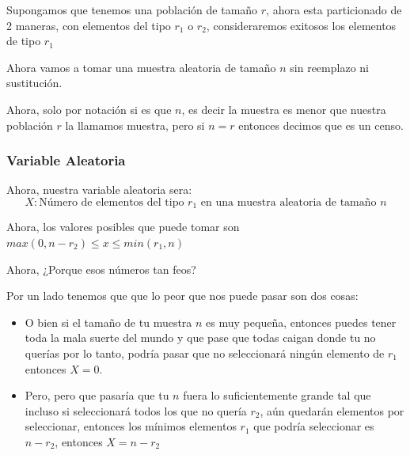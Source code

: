 \documentclass[12pt, fleqn]{report}                             %
\theoremstyle{break}                                            %
\begin{document}
                Supongamos que tenemos una población de tamaño $r$, ahora
                esta particionado de 2 maneras, con elementos del tipo $r_1$
                o $r_2$, consideraremos exitosos los elementos de tipo $r_1$

                Ahora vamos a tomar una muestra aleatoria de tamaño $n$ sin reemplazo
                ni sustitución.

                Ahora, solo por notación si es que $n$, es decir la muestra es menor
                que nuestra población $r$ la llamamos muestra, pero si $n = r$ entonces
                decimos que es un censo.

                \vspace{1em}
                \subsubsection{Variable Aleatoria}

                    Ahora, nuestra variable aleatoria sera:
                    \begin{equation*}
                        X : \text{Número de elementos del tipo $r_1$ en una muestra aleatoria de tamaño $n$}
                    \end{equation*}

                    Ahora, los valores posibles que puede tomar son $max(0, n - r_2) \leq x \leq min(r_1, n)$

                    Ahora, ¿Porque esos números tan feos?

                    Por un lado tenemos que que lo peor que nos puede pasar son dos cosas:
                    \begin{itemize}
                        \item 
                            O bien si el tamaño de tu muestra $n$ es muy pequeña, entonces puedes
                            tener toda la mala suerte del mundo y que pase que todas caigan donde
                            tu no querías por lo tanto, podría pasar que no seleccionará
                            ningún elemento de $r_1$ entonces $X = 0$.

                        \item
                            Pero, pero que pasaría que tu $n$ fuera lo suficientemente grande tal que
                            incluso si seleccionará todos los que no quería $r_2$, aún quedarán elementos
                            por seleccionar, entonces los mínimos elementos $r_1$ que podría seleccionar 
                            es $n - r_2$, entonces $X = n - r_2$ 

                    \end{itemize}
\end{document}

